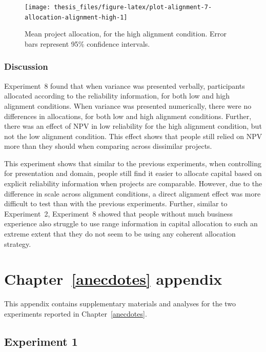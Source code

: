\documentclass[a4paper, nobind, dvipsnames]{templates/ociamthesis}
\theoremstyle{definition}
\theoremstyle{definition}
\theoremstyle{definition}
\theoremstyle{definition}
\theoremstyle{remark}
\begin{document}
\begin{figure}
\texttt{[image: thesis\_files/figure-latex/plot-alignment-7-allocation-alignment-high-1]} \caption{Mean project allocation, for the high alignment condition. Error bars represent 95\% confidence intervals.}\label{fig:plot-alignment-7-allocation-alignment-high}
\end{figure}

\subsection{Discussion}

Experiment~8 found that when variance was presented verbally, participants
allocated according to the reliability information, for both low and high
alignment conditions. When variance was presented numerically, there were no
differences in allocations, for both low and high alignment conditions. Further,
there was an effect of NPV in low reliability for the high alignment condition,
but not the low alignment condition. This effect shows that people still relied
on NPV more than they should when comparing across dissimilar projects.

This experiment shows that similar to the previous experiments, when controlling
for presentation and domain, people still find it easier to allocate capital
based on explicit reliability information when projects are comparable. However,
due to the difference in scale across alignment conditions, a direct alignment
effect was more difficult to test than with the previous experiments. Further,
similar to Experiment~2, Experiment~8 showed that people without much business
experience also struggle to use range information in capital allocation to such
an extreme extent that they do not seem to be using any coherent allocation
strategy.

\hypertarget{anecdotes-appendix}{%
\chapter{Chapter~\ref{anecdotes} appendix}\label{anecdotes-appendix}}

\minitoc

This appendix contains supplementary materials and analyses for the two
experiments reported in Chapter~\ref{anecdotes}.

\hypertarget{anecdotes-1-appendix}{%
\section{Experiment 1}\label{anecdotes-1-appendix}}
\end{document}
